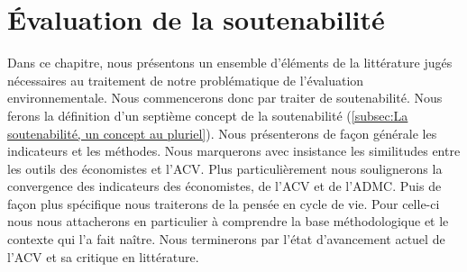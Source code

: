 \chapter{Évaluation de la soutenabilité}
\label{chap:Évaluation de la Soutenabilité, un État de l'art}
Dans ce chapitre, nous présentons un ensemble d'éléments de la littérature jugés nécessaires au traitement de notre problématique de l'évaluation environnementale.
Nous commencerons donc par traiter de soutenabilité.
Nous ferons la définition d'un septième concept de la soutenabilité (\ref{subsec:La soutenabilité, un concept au pluriel}).
Nous présenterons de façon générale les indicateurs et les méthodes.
Nous marquerons avec insistance les similitudes entre les outils des économistes et l'\gls{ACV}.
Plus particulièrement nous soulignerons la convergence des indicateurs des économistes, de l'\gls{ACV} et de l'\acrshort{ADMC}.
Puis de façon plus spécifique nous traiterons de la pensée en cycle de vie.
Pour celle-ci nous nous attacherons en particulier à comprendre la base méthodologique et le contexte qui l'a fait naître.
Nous terminerons par l'état d'avancement actuel de l'\gls{ACV} et sa critique en littérature.
